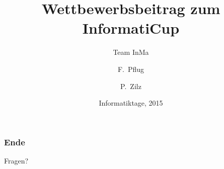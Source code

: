 \documentclass{beamer}
\title[Wettbewerbsbeitrag] %
{Wettbewerbsbeitrag zum InformatiCup}
\subtitle{Team InMa}
\author[Pflug, Zilz] %
{F.~Pflug\inst{1} \and P.~Zilz\inst{2}}
\institute[Leibniz Universität Hannover] %
{
  \inst{1}%
  Fakultät für Elektrotechnik und Informatik\\
  Leibniz Universität Hannover
  \and
  \inst{2}%
  Fakultät für Mathematik und Physik\\
  Leibniz Universität Hannover
}
\date[Informatiktage 2015] %
{Informatiktage, 2015}
\begin{document}
\frame{\titlepage}









\begin{frame}
    \frametitle{Ende}
    \begin{center}
		\huge{Fragen?}
    \end{center}
\end{frame}


\end{document}
